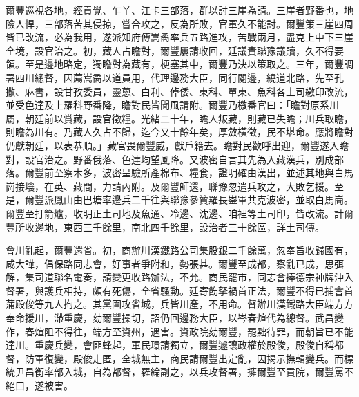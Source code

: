 \begin{pinyinscope}
爾豐巡視各地，經貢覺、乍丫、江卡三部落，群以討三崖為請。三崖者野番也，地險人悍，三部落苦其侵掠，嘗合攻之，反為所敗，官軍久不能討。爾豐策三崖四周皆已改流，必為我用，遂派知府傅嵩矞率兵五路進攻，苦戰兩月，盡克上中下三崖全境，設官治之。初，藏人占瞻對，爾豐屢請收回，廷議責聯豫議贖，久不得要領。至是邊地略定，獨瞻對為藏有，梗塞其中，爾豐乃決以策取之。三年，爾豐調署四川總督，因薦嵩矞以道員用，代理邊務大臣，同行閱邊，繞道北路，先至孔撒、麻書，設甘孜委員，靈蔥、白利、倬倭、東科、單東、魚科各土司繳印改流，並受色達及上羅科野番降，瞻對民皆聞風請附。爾豐乃檄番官曰：「瞻對原系川屬，朝廷前以賞藏，設官徵糧。光緒二十年，瞻人叛藏，則藏已失瞻；川兵取瞻，則瞻為川有。乃藏人久占不歸，迄今又十餘年矣，厚斂橫徵，民不堪命。應將瞻對仍獻朝廷，以表恭順。」藏官畏爾豐威，獻戶籍去。瞻對民歡呼出迎，爾豐遂入瞻對，設官治之。野番俄落、色達均望風降。又波密自言其先為入藏漢兵，別成部落。爾豐前至察木多，波密呈驗所產棉布、糧食，證明確由漢出，並述其地與白馬崗接壤，在英、藏間，力請內附。及爾豐師還，聯豫忽遣兵攻之，大敗乞援。至是，爾豐派鳳山由巴塘率邊兵二千往與聯豫參贊羅長崟軍共克波密，並取白馬崗。爾豐至打箭爐，收明正土司地及魚通、冷邊、沈邊、咱裡等土司印，皆改流。計爾豐所收邊地，東西三千餘里，南北四千餘里，設治者三十餘區，詳土司傳。

會川亂起，爾豐還省。初，商辦川漢鐵路公司集股銀二千餘萬，忽奉旨收歸國有，咸大譁，倡保路同志會，好事者爭附和，勢張甚。爾豐至成都，察亂已成，思弭解，集司道聯名電奏，請變更收路辦法，不允。商民罷市，同志會捧德宗神牌沖入督署，與護兵相持，頗有死傷，全省騷動。廷寄飭拏禍首正法，爾豐不得已捕會首蒲殿俊等九人拘之。其黨圍攻省城，兵皆川產，不用命。督辦川漢鐵路大臣端方方奉命援川，滯重慶，劾爾豐操切，詔仍回邊務大臣，以岑春煊代為總督。武昌變作，春煊阻不得往，端方至資州，遇害。資政院劾爾豐，罷黜待罪，而朝旨已不能達川。重慶兵變，會匪蜂起，軍民環請獨立，爾豐遽讓政權於殿俊，殿俊自稱都督，防軍復變，殿俊走匿，全城無主，商民請爾豐出定亂，因揭示撫輯變兵。而標統尹昌衡率部入城，自為都督，羅綸副之，以兵攻督署，擁爾豐至貢院，爾豐罵不絕口，遂被害。


\end{pinyinscope}